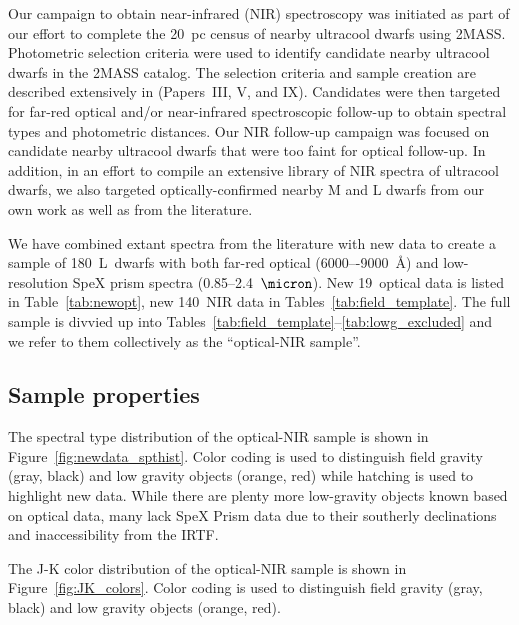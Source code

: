 \documentclass[12pt,preprint]{aastex}
\newcommand{\sample}{180}
\newcommand{\newopt}{19} %
\newcommand{\prismspectra}{140} %
\begin{document}
Our campaign to obtain near-infrared (NIR) spectroscopy was initiated as part of our effort to complete the 20~pc census of nearby ultracool dwarfs using 2MASS. Photometric selection criteria were used to identify candidate nearby ultracool dwarfs in the 2MASS catalog. The selection criteria and sample creation are described extensively in \cite{Cruz03,Cruz07,Reid08} (Papers~III, V, and IX). Candidates were then targeted for far-red optical and/or near-infrared spectroscopic follow-up to obtain spectral types and photometric distances. Our NIR follow-up campaign was focused on candidate nearby ultracool dwarfs that were too faint for optical follow-up. In addition, in an effort to compile an extensive library of NIR spectra of ultracool dwarfs, we also targeted optically-confirmed nearby M and L dwarfs from our own work as well as from the literature. 


We have combined extant spectra from the literature with new data to create a sample of \sample~L~dwarfs with both far-red optical (6000–-9000~\AA) and low-resolution SpeX prism spectra (0.85--2.4~$\micron$). New \newopt~optical data is listed in Table~\ref{tab:newopt}, new \prismspectra~NIR data in Tables~\ref{tab:field_template}. 
The full sample is divvied up into Tables~\ref{tab:field_template}--\ref{tab:lowg_excluded} and we refer to them collectively as the ``optical-NIR sample''. 

\subsection{Sample properties}

The spectral type distribution of the optical-NIR sample is shown in Figure~\ref{fig:newdata_spthist}. Color coding is used to distinguish field gravity (gray, black) and low gravity objects (orange, red) while hatching is used to highlight new data.
While there are plenty more low-gravity objects known based on optical data, many lack SpeX Prism data due to their southerly declinations and inaccessibility from the IRTF.

The J-K color distribution of the optical-NIR sample is shown in Figure~\ref{fig:JK_colors}. Color coding is used to distinguish field gravity (gray, black) and low gravity objects (orange, red). 
\end{document}
